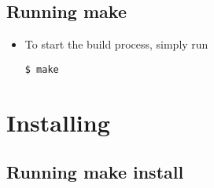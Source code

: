 \subsection{Running make\label{inst-make}}

\begin{itemize}

\item
To start the build process, simply run
\begin{verbatim}
$ make
\end{verbatim}



\end{itemize}

\section{Installing\label{inst-installing}}

\subsection{Running make install\label{inst-makeinstall}}

